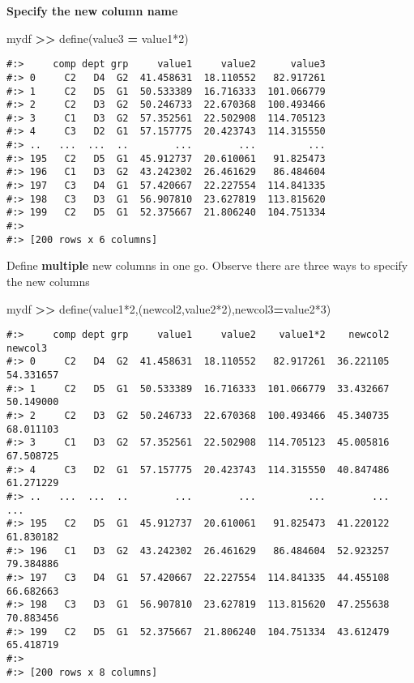 \documentclass[
]{book}
\newenvironment{Shaded}{\begin{snugshade}}{\end{snugshade}}
\newcommand{\NormalTok}[1]{#1}
\newcommand{\OperatorTok}[1]{\textcolor[rgb]{0.43,0.43,0.43}{\textbf{#1}}}
\newcommand{\StringTok}[1]{\textcolor[rgb]{0.5,0.5,0.5}{#1}}
\begin{document}
\textbf{Specify the new column name}

\begin{Shaded}
\begin{Highlighting}[]
\NormalTok{mydf }\OperatorTok{\textgreater{}\textgreater{}}\NormalTok{ define(value3 }\OperatorTok{=} \StringTok{\textquotesingle{}value1*2\textquotesingle{}}\NormalTok{)}
\end{Highlighting}
\end{Shaded}

\begin{verbatim}
#:>     comp dept grp     value1     value2      value3
#:> 0     C2   D4  G2  41.458631  18.110552   82.917261
#:> 1     C2   D5  G1  50.533389  16.716333  101.066779
#:> 2     C2   D3  G2  50.246733  22.670368  100.493466
#:> 3     C1   D3  G2  57.352561  22.502908  114.705123
#:> 4     C3   D2  G1  57.157775  20.423743  114.315550
#:> ..   ...  ...  ..        ...        ...         ...
#:> 195   C2   D5  G1  45.912737  20.610061   91.825473
#:> 196   C1   D3  G2  43.242302  26.461629   86.484604
#:> 197   C3   D4  G1  57.420667  22.227554  114.841335
#:> 198   C3   D3  G1  56.907810  23.627819  113.815620
#:> 199   C2   D5  G1  52.375667  21.806240  104.751334
#:> 
#:> [200 rows x 6 columns]
\end{verbatim}

Define \textbf{multiple} new columns in one go. Observe there are three ways to specify the new columns

\begin{Shaded}
\begin{Highlighting}[]
\NormalTok{mydf }\OperatorTok{\textgreater{}\textgreater{}}\NormalTok{ define(}\StringTok{\textquotesingle{}value1*2\textquotesingle{}}\NormalTok{,(}\StringTok{\textquotesingle{}newcol2\textquotesingle{}}\NormalTok{,}\StringTok{\textquotesingle{}value2*2\textquotesingle{}}\NormalTok{),newcol3}\OperatorTok{=}\StringTok{\textquotesingle{}value2*3\textquotesingle{}}\NormalTok{)}
\end{Highlighting}
\end{Shaded}

\begin{verbatim}
#:>     comp dept grp     value1     value2    value1*2    newcol2    newcol3
#:> 0     C2   D4  G2  41.458631  18.110552   82.917261  36.221105  54.331657
#:> 1     C2   D5  G1  50.533389  16.716333  101.066779  33.432667  50.149000
#:> 2     C2   D3  G2  50.246733  22.670368  100.493466  45.340735  68.011103
#:> 3     C1   D3  G2  57.352561  22.502908  114.705123  45.005816  67.508725
#:> 4     C3   D2  G1  57.157775  20.423743  114.315550  40.847486  61.271229
#:> ..   ...  ...  ..        ...        ...         ...        ...        ...
#:> 195   C2   D5  G1  45.912737  20.610061   91.825473  41.220122  61.830182
#:> 196   C1   D3  G2  43.242302  26.461629   86.484604  52.923257  79.384886
#:> 197   C3   D4  G1  57.420667  22.227554  114.841335  44.455108  66.682663
#:> 198   C3   D3  G1  56.907810  23.627819  113.815620  47.255638  70.883456
#:> 199   C2   D5  G1  52.375667  21.806240  104.751334  43.612479  65.418719
#:> 
#:> [200 rows x 8 columns]
\end{verbatim}
\end{document}
